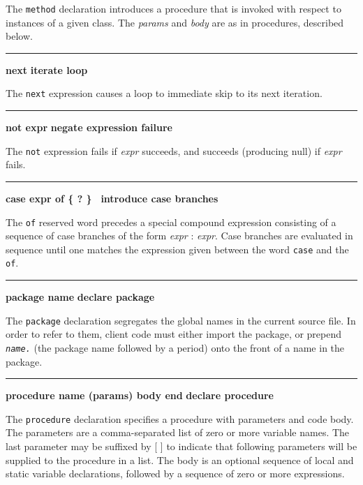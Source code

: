 \noindent
{}The \texttt{method} declaration introduces a procedure
that is invoked with respect to instances of
a given class. The \textit{params} and \textit{body}
are as in procedures, described below.

\bigskip\hrule\vspace{0.1cm}
\noindent
{\bf next } \hfill {\bf iterate loop}

\noindent
{}The \texttt{next} expression causes a loop to
immediate skip to its next iteration.

\bigskip\hrule\vspace{0.1cm}
\noindent
{\bf not expr } \hfill {\bf negate expression failure}

\noindent
{}The \texttt{not} expression fails if \textit{expr} succeeds,
and succeeds (producing null) if \textit{expr} fails.

\bigskip\hrule\vspace{0.1cm}
\noindent
{\bf case expr of \{ ? \}\ } \hfill {\bf introduce case branches}

\noindent
{}The \texttt{of} reserved word precedes a special compound
expression consisting of a sequence of case branches of the form
\textit{expr} : \textit{expr}. Case branches are evaluated in sequence
until one matches the expression given between the word
\texttt{case} and the \texttt{of}.

\bigskip\hrule\vspace{0.1cm}
\noindent
{\bf package name } \hfill {\bf declare package}

\noindent
{}The \texttt{package} declaration segregates the global
names in the current source file. In order to refer to them, client
code must either import the package, or prepend
\texttt{\textit{name.}} (the package name followed by a period)
onto the front of a name in the package.

\bigskip\hrule\vspace{0.1cm}
\noindent
{\bf procedure name (params) body end } \hfill {\bf declare procedure}

\noindent
{}The \texttt{procedure} declaration specifies a
procedure with parameters and code body. The parameters
are a comma-separated list of zero or more variable names. The last
parameter may be suffixed by [ ] to indicate that
following parameters will be supplied to the procedure in a list. The
body is an optional sequence of local and static variable declarations,
followed by a sequence of zero or more expressions.

